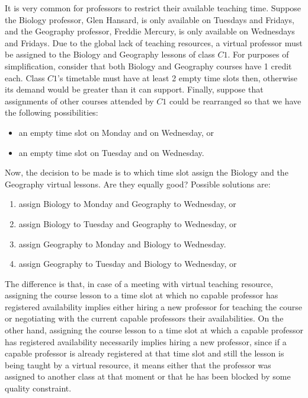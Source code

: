 It is very common for professors to restrict their available teaching time. Suppose the Biology professor, Glen Hansard, is only available on Tuesdays and Fridays, and the Geography professor, Freddie Mercury, is only available on Wednesdays and Fridays. Due to the global lack of teaching resources, a virtual professor must be assigned to the Biology and Geography lessons of class $C1$. For purposes of simplification, consider that both Biology and Geography courses have 1 credit each. Class $C1$'s timetable must have at least 2 empty time slots then, otherwise its demand would be greater than it can support. Finally, suppose that assignments of other courses attended by $C1$ could be rearranged so that we have the following possibilities:
\begin{itemize}
\item an empty time slot on Monday and on Wednesday, or
\item an empty time slot on Tuesday and on Wednesday.
\end{itemize}

Now, the decision to be made is to which time slot assign the Biology and the Geography virtual lessons. Are they equally good? Possible solutions are:
\begin{enumerate}
\item assign Biology to Monday and Geography to Wednesday, or \label{bmgw}
\item assign Biology to Tuesday and Geography to Wednesday, or \label{btgw}
\item assign Geography to Monday and Biology to Wednesday. \label{gmbw}
\item assign Geography to Tuesday and Biology to Wednesday, or \label{gtbw}
\end{enumerate}

The difference is that, in case of a meeting with virtual teaching resource, assigning the course lesson to a time slot at which no capable professor has registered availability implies either hiring a new professor for teaching the course or negotiating with the current capable professors their availabilities. On the other hand, assigning the course lesson to a time slot at which a capable professor has registered availability necessarily implies hiring a new professor, since if a capable professor is already registered at that time slot and still the lesson is being taught by a virtual resource, it means either that the professor was assigned to another class at that moment or that he has been blocked by some quality constraint.

